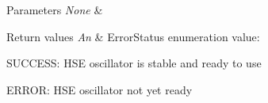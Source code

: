 \begin{DoxyParams}{Parameters}
{\em None} & \\
\hline
\end{DoxyParams}

\begin{DoxyRetVals}{Return values}
{\em An} & Error\+Status enumeration value\+:
\begin{DoxyItemize}
\item S\+U\+C\+C\+E\+SS\+: H\+SE oscillator is stable and ready to use
\item E\+R\+R\+OR\+: H\+SE oscillator not yet ready 
\end{DoxyItemize}\\
\hline
\end{DoxyRetVals}
